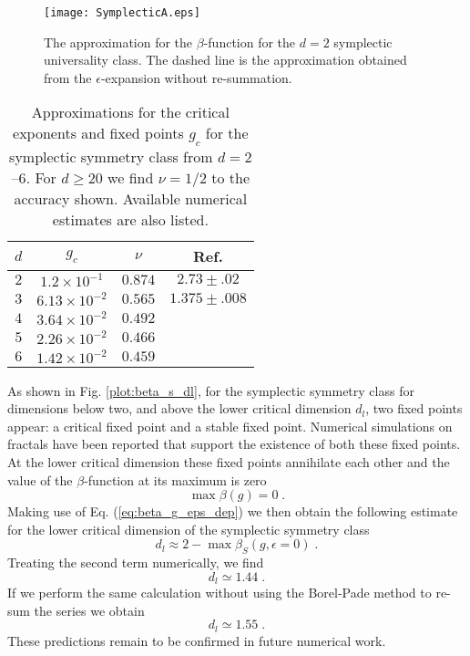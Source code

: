 \documentclass[singlecolumn]{jpsj3}
\begin{document}
\begin{figure}[tb]
\begin{center}
\texttt{[image: SymplecticA.eps]}
\caption{The approximation for the $\beta$-function for the $d=2$ symplectic universality class. The dashed line is the approximation obtained from the $\epsilon$-expansion without re-summation.}
\label{plot:beta_sa}
\end{center}
\end{figure}

\begin{table}[ht]
	\begin{center}
	\begin{tabular}{|c||c|c||c|} \hline
      	$d$ & $g_c$ & $\nu$ & Ref.\cite{Asada05,Asada02} \\ \hline
      	$2$ & $1.2  \times 10^{-1}$ &$0.874$ & $2.73\pm.02$ \\ \hline
      	$3$ & $6.13 \times 10^{-2}$ &$0.565$ & $1.375\pm.008$ \\ \hline
      	$4$ & $3.64 \times 10^{-2}$ &$0.492$ & \\ \hline
      	$5$ & $2.26 \times 10^{-2}$ &$0.466$ & \\ \hline
      	$6$ & $1.42 \times 10^{-2}$ &$0.459$ & \\ \hline
	\end{tabular}
	\end{center}
	\caption{
	Approximations for the critical exponents and fixed points $g_c$ for the symplectic symmetry class from $d=2$--$6$.
For $d\ge 20$ we find $\nu=1/2$ to the accuracy shown.
Available numerical estimates are also listed.} \label{table:s_integer_d}
\end{table}

As shown in Fig. \ref{plot:beta_s_dl}, for the symplectic symmetry class for dimensions below two, and above the lower critical dimension $d_l$, two fixed points appear:
a critical fixed point and a stable fixed point.
Numerical simulations on fractals have been reported that support the existence of both these
fixed points.\cite{Asada06,Sticlet16}
At the lower critical dimension these fixed points annihilate each other and the value of the $\beta$-function at its maximum is zero
\begin{equation}
  \max \beta(g) = 0 \;.
\end{equation}
Making use of Eq. (\ref{eq:beta_g_eps_dep}) we then obtain the following estimate for the lower critical dimension of the symplectic symmetry class
\begin{equation}
  d_l \approx 2 - \max  \beta_{S} \left( g , \epsilon = 0 \right) \;.
\end{equation}
Treating the second term numerically, we find
 \begin{equation}\label{eq:d_l}
   d_l \simeq 1.44 \;.
 \end{equation}
If we perform the same calculation without using the Borel-Pade method to re-sum the series we obtain
 \begin{equation}
   d_l \simeq 1.55 \;.
 \end{equation}
These predictions remain to be confirmed in future numerical work.
\end{document}
